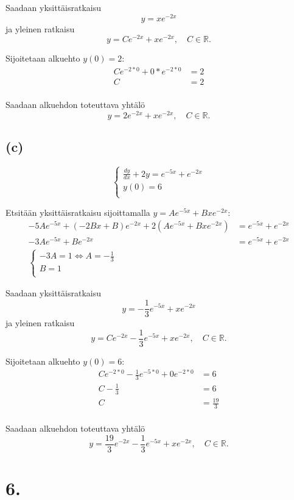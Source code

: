 \documentclass{article}
\begin{document}
Saadaan yksittäisratkaisu
\[
  y = xe^{-2x}
\]
ja yleinen ratkaisu
\[
  y = Ce^{-2x} + xe^{-2x}, \quad C \in \mathbb{R}.
\]

Sijoitetaan alkuehto $y(0) = 2$:
\begin{align*}
  Ce^{-2*0} + 0*e^{-2*0} &= 2 \\
  C &= 2 \\
\end{align*}

Saadaan alkuehdon toteuttava yhtälö
\[
  y = 2e^{-2x} + xe^{-2x}, \quad C \in \mathbb{R}.
\]

\subsection*{(c)}

\[
  \begin{cases}
    \frac{dy}{dx} + 2y = e^{-5x} + e^{-2x} \\
    y(0) = 6 \\
  \end{cases}
\]

Etsitään yksittäisratkaisu sijoittamalla $y = Ae^{-5x} + Bxe^{-2x}$:
\begin{align*}
  -5Ae^{-5x} + (-2Bx + B)e^{-2x} + 2(Ae^{-5x} + Bxe^{-2x}) &= e^{-5x} + e^{-2x} \\
  -3Ae^{-5x} + Be^{-2x} &= e^{-5x} + e^{-2x} \\
  \begin{cases}
    -3A = 1 \iff A = -\frac{1}{3} \\
    B = 1 \\
  \end{cases}
\end{align*}

Saadaan yksittäisratkaisu
\[
  y = -\frac{1}{3}e^{-5x} + xe^{-2x}
\]
ja yleinen ratkaisu
\[
  y = Ce^{-2x} - \frac{1}{3}e^{-5x} + xe^{-2x}, \quad C \in \mathbb{R}.
\]

Sijoitetaan alkuehto $y(0) = 6$:
\begin{align*}
  Ce^{-2*0} - \frac{1}{3}e^{-5*0} + 0e^{-2*0} &= 6 \\
  C - \frac{1}{3} &= 6 \\
  C &= \frac{19}{3} \\
\end{align*}

Saadaan alkuehdon toteuttava yhtälö
\[
  y = \frac{19}{3}e^{-2x} - \frac{1}{3}e^{-5x} + xe^{-2x}, \quad C \in \mathbb{R}.
\]

\section*{6.}
\end{document}
